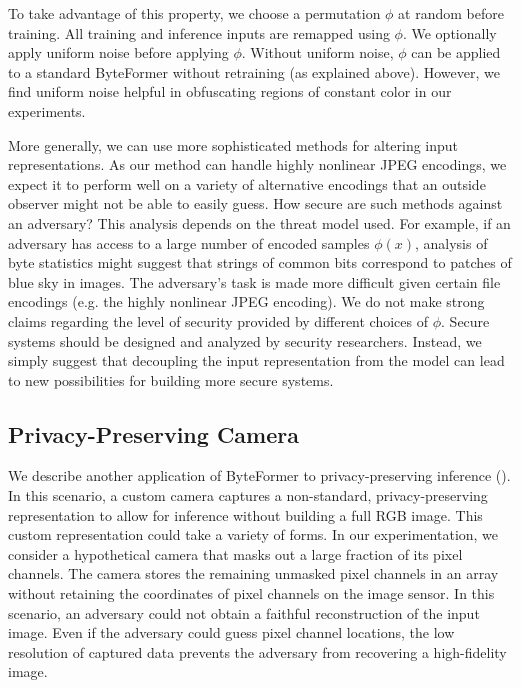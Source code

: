 To take advantage of this property, we choose a permutation $\phi$ at random before training. All training and inference inputs are remapped using $\phi$. We optionally apply uniform noise before applying $\phi$. Without uniform noise, $\phi$ can be applied to a standard ByteFormer without retraining (as explained above). However, we find uniform noise helpful in obfuscating regions of constant color in our experiments.

More generally, we can use more sophisticated methods for altering input representations. As our method can handle highly nonlinear JPEG encodings, we expect it to perform well on a variety of alternative encodings that an outside observer might not be able to easily guess. How secure are such methods against an adversary? This analysis depends on the threat model used. For example, if an adversary has access to a large number of encoded samples $\phi(x)$, analysis of byte statistics might suggest that strings of common bits correspond to patches of blue sky in images. The adversary's task is made more difficult given certain file encodings (e.g. the highly nonlinear JPEG encoding). We do not make strong claims regarding the level of security provided by different choices of $\phi$. Secure systems should be designed and analyzed by security researchers. Instead, we simply suggest that decoupling the input representation from the model can lead to new possibilities for building more secure systems.

\subsection{Privacy-Preserving Camera} \label{sec:methods-privacy-preserving-camera}
We describe another application of ByteFormer to privacy-preserving inference (). In this scenario, a custom camera captures a non-standard, privacy-preserving representation to allow for inference without building a full RGB image. This custom representation could take a variety of forms. In our experimentation, we consider a hypothetical camera that masks out a large fraction of its pixel channels. The camera stores the remaining unmasked pixel channels in an array without retaining the coordinates of pixel channels on the image sensor. In this scenario, an adversary could not obtain a faithful reconstruction of the input image. Even if the adversary could guess pixel channel locations, the low resolution of captured data prevents the adversary from recovering a high-fidelity image.

